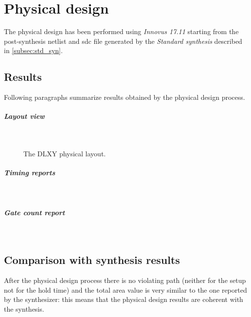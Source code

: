 \graphicspath{{./chapters/04-physical_design/figures/}}

\chapter{Physical design}
\label{chap:physical_design}
The physical design has been performed using \textit{Innovus 17.11} starting
from the post-synthesis netlist and sdc file generated by the \textit{Standard
synthesis} described in \ref{subsec:std_syn}.

\section{Results}
Following paragraphs summarize results obtained by the physical design process.
\paragraph{Layout view} \mbox{} \\
\begin{figure}[H]
	\centering
	\label{fig:layout}
	\caption{The DLXY physical layout.}
\end{figure}

\paragraph{Timing reports} \mbox{} \\
\lstset{
	basicstyle=\tiny,
	frame=single,
	breaklines=true
}



\paragraph{Gate count report} \mbox{} \\


\section{Comparison with synthesis results}
After the physical design process there is no violating path (neither for the
setup not for the hold time) and the total area value is very similar to the one
reported by the synthesizer: this means that the physical design results are
coherent with the synthesis.

